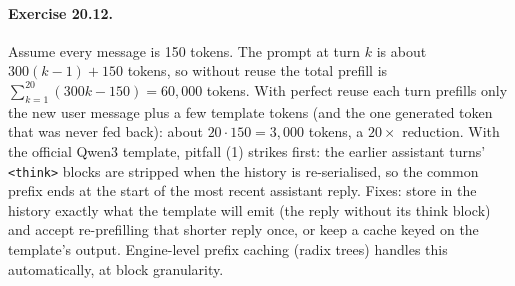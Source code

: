 \paragraph{Exercise 20.12.} Assume every message is 150 tokens. The prompt at turn $k$ is
about $300(k-1)+150$ tokens, so without reuse the total prefill is
$\sum_{k=1}^{20}(300k-150)=60{,}000$ tokens. With perfect reuse each turn prefills only
the new user message plus a few template tokens (and the one generated token that was
never fed back): about $20\cdot150=3{,}000$ tokens, a $20\times$ reduction. With the
official Qwen3 template, pitfall (1) strikes first: the earlier assistant turns'
\texttt{<think>} blocks are stripped when the history is re-serialised, so the common
prefix ends at the start of the most recent assistant reply. Fixes: store in the history
exactly what the template will emit (the reply without its think block) and accept
re-prefilling that shorter reply once, or keep a cache keyed on the template's output.
Engine-level prefix caching (radix trees) handles this automatically, at block
granularity.
